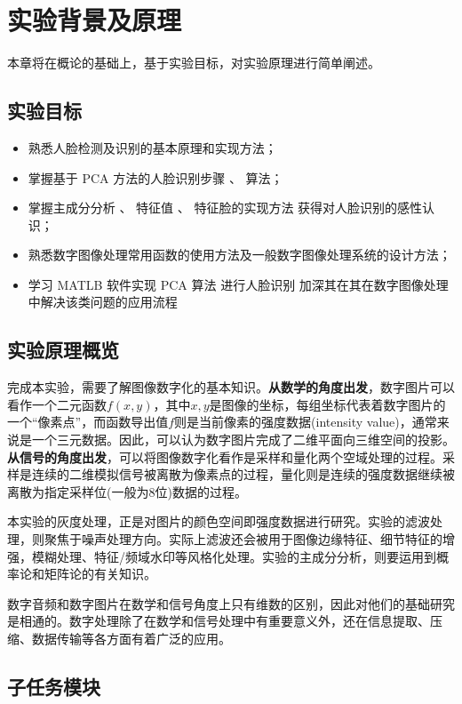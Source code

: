 \chapter{实验背景及原理}
\label{cha:bg}
本章将在概论的基础上，基于实验目标，对实验原理进行简单阐述。

\section{实验目标}

\begin{itemize}
    \item 熟悉人脸检测及识别的基本原理和实现方法；
    \item 掌握基于 PCA 方法的人脸识别步骤 、 算法；
    \item 掌握主成分分析 、 特征值 、 特征脸的实现方法 获得对人脸识别的感性认识；
    \item 熟悉数字图像处理常用函数的使用方法及一般数字图像处理系统的设计方法；
    \item 学习 MATLB 软件实现 PCA 算法 进行人脸识别 加深其在其在数字图像处理中解决该类问题的应用流程
\end{itemize}

\section{实验原理概览}

完成本实验，需要了解图像数字化的基本知识。\textbf{从数学的角度出发}，数字图片可以看作一个二元函数$f(x, y)$，其中$x, y$是图像的坐标，每组坐标代表着数字图片的一个“像素点”，而函数导出值$f$则是当前像素的强度数据(intensity value)，通常来说是一个三元数据。因此，可以认为数字图片完成了二维平面向三维空间的投影。\cite{Tyagi_2018}\textbf{从信号的角度出发}，可以将图像数字化看作是采样和量化两个空域处理的过程。采样是连续的二维模拟信号被离散为像素点的过程，量化则是连续的强度数据继续被离散为指定采样位(一般为8位)数据的过程。

本实验的灰度处理，正是对图片的颜色空间即强度数据进行研究。实验的滤波处理，则聚焦于噪声处理方向。实际上滤波还会被用于图像边缘特征、细节特征的增强，模糊处理、特征/频域水印等风格化处理。实验的主成分分析，则要运用到概率论和矩阵论的有关知识。

数字音频和数字图片在数学和信号角度上只有维数的区别，因此对他们的基础研究是相通的。数字处理除了在数学和信号处理中有重要意义外，还在信息提取、压缩、数据传输等各方面有着广泛的应用。

\section{子任务模块}


